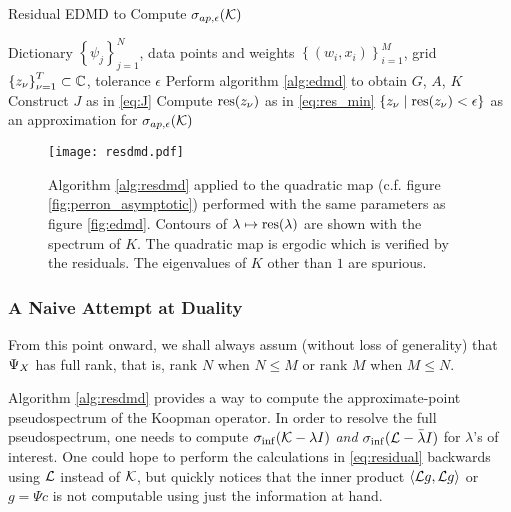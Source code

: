 \begin{algorithm}
    \caption{Residual EDMD to Compute $\sigma_{ap, \epsilon} (\mathcal{K})$}
    \label{alg:resdmd}
    \begin{algorithmic}[1]
        \Require Dictionary $\left\{ \psi_j \right\}_{j=1}^N$, 
            data points and weights $\left\{ (w_i, x_i) \right\}_{i=1}^M$, 
            grid $\left\{ z_\nu \right\}_{\nu=1}^T \subset \mathbb{C}$,
            tolerance $\epsilon$
        \State Perform algorithm \ref{alg:edmd} to obtain $G$, $A$, $K$
        \State Construct $J$ as in \ref{eq:J}
            \State Compute $\text{res} (z_\nu)$ as in \ref{eq:res_min}
        \EndFor
        \State \Return $\left\{ z_\nu \mid \text{res} (z_\nu) < \epsilon \right\}$
            as an approximation for $\sigma_{ap, \epsilon} (\mathcal{K})$
    \end{algorithmic}
\end{algorithm}

\begin{figure}
    \centering
    \texttt{[image: resdmd.pdf]}
    \caption{
        Algorithm \ref{alg:resdmd} applied to the quadratic map (c.f. figure 
        \ref{fig:perron_asymptotic}) performed with the same parameters as 
        figure \ref{fig:edmd}. Contours of $\lambda \mapsto \text{res} (\lambda)$ are shown with 
        the spectrum of $K$. The quadratic map is ergodic \cite{logisitc_ergodic} 
        which is verified by the residuals. The eigenvalues of $K$ other than $1$ 
        are spurious. 
    }\label{fig:resdmd}
\end{figure}


\subsubsection{A Naive Attempt at Duality}

From this point onward, we shall always assum (without loss of generality) that $\Psi_X$ has 
full rank, that is, rank $N$ when $N \leq M$ or rank $M$ when $M \leq N$. 

Algorithm \ref{alg:resdmd} provides a way to compute the approximate-point pseudospectrum 
of the Koopman operator. In order to resolve the full pseudospectrum, one needs to compute 
$\sigma_{\inf} (\mathcal{K} - \lambda I)$ \emph{and} $\sigma_{\inf} (\mathcal{L} - \bar{\lambda} I)$ 
for $\lambda$'s of interest. One could hope to perform the calculations in \ref{eq:residual} 
backwards using $\mathcal{L}$ instead of $\mathcal{K}$, but quickly notices that the inner product 
$\left\langle \mathcal{L} g, \mathcal{L} g \right\rangle$ or $g = \Psi c$ is not computable using just 
the information at hand. 

